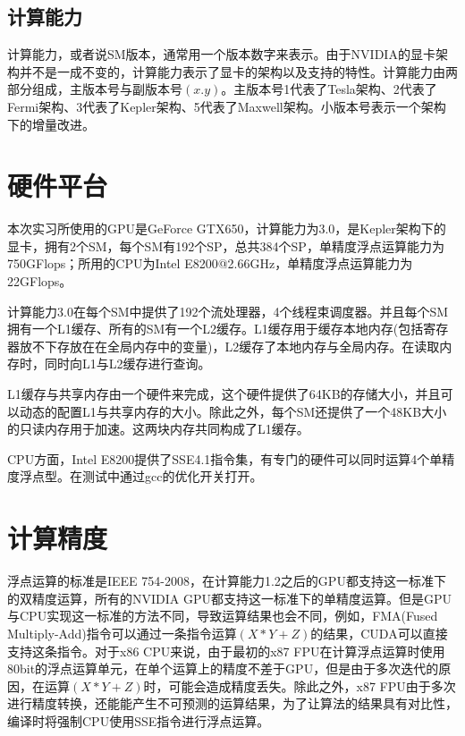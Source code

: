     \subsection{计算能力}
      计算能力，或者说SM版本，通常用一个版本数字来表示。由于NVIDIA的显卡架构并不是一成不变的，计算能力表示了显卡的架构以及支持的特性。计算能力由两部分组成，主版本号与副版本号$(x.y)$。主版本号1代表了Tesla架构、2代表了Fermi架构、3代表了Kepler架构、5代表了Maxwell架构。小版本号表示一个架构下的增量改进。
  \section{硬件平台}
    本次实习所使用的GPU是GeForce GTX650，计算能力为3.0，是Kepler架构下的显卡，拥有2个SM，每个SM有192个SP，总共384个SP，单精度浮点运算能力为750GFlops；所用的CPU为Intel E8200@2.66GHz，单精度浮点运算能力为22GFlops。
    \par
    计算能力3.0在每个SM中提供了192个流处理器，4个线程束调度器。并且每个SM拥有一个L1缓存、所有的SM有一个L2缓存。L1缓存用于缓存本地内存(包括寄存器放不下存放在在全局内存中的变量)，L2缓存了本地内存与全局内存。在读取内存时，同时向L1与L2缓存进行查询。
    \par
    L1缓存与共享内存由一个硬件来完成，这个硬件提供了64KB的存储大小，并且可以动态的配置L1与共享内存的大小。除此之外，每个SM还提供了一个48KB大小的只读内存用于加速。这两块内存共同构成了L1缓存。
    \par
    CPU方面，Intel E8200提供了SSE4.1指令集，有专门的硬件可以同时运算4个单精度浮点型。在测试中通过gcc的优化开关打开。
  \section{计算精度}
    浮点运算的标准是IEEE 754-2008，在计算能力1.2之后的GPU都支持这一标准下的双精度运算，所有的NVIDIA GPU都支持这一标准下的单精度运算。但是GPU与CPU实现这一标准的方法不同，导致运算结果也会不同，例如，FMA(Fused Multiply-Add)指令可以通过一条指令运算$(X*Y+Z)$的结果，CUDA可以直接支持这条指令。对于x86 CPU来说，由于最初的x87 FPU在计算浮点运算时使用80bit的浮点运算单元，在单个运算上的精度不差于GPU，但是由于多次迭代的原因，在运算$(X*Y+Z)$时，可能会造成精度丢失。除此之外，x87 FPU由于多次进行精度转换，还能能产生不可预测的运算结果，为了让算法的结果具有对比性，编译时将强制CPU使用SSE指令进行浮点运算。